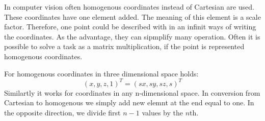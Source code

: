 In computer vision often homogenous coordinates instead of Cartesian are used.
These coordinates have one element added. The meaning of this element is a
scale factor.  Therefore, one point could be described with in an infinit ways
of writing the coordinates. As the advantage, they can sipmplify many
operation. Often it is possible to solve a task as a matrix multiplication, if
the point is represented homogenous coordinates.

For homogenous coordinates in three dimensional space holds:
$$ (x, y, z, 1)^T = (sx, sy, sz, s)^T $$
Similartly it works for coordinates in any n-dimensional space. In conversion
from Cartesian to homogenous we simply add new elemnt at the end equal to one.
In the opposite direction, we divide first $n-1$ values by the $n$th.
